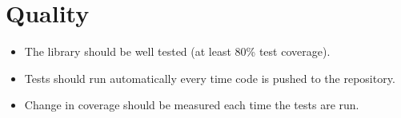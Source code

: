 \section{Quality}

\begin{itemize}
	\item The library should be well tested (at least 80\% test coverage).
	\item Tests should run automatically every time code is pushed to the
		repository.
	\item Change in coverage should be measured each time the tests are run.
\end{itemize}

